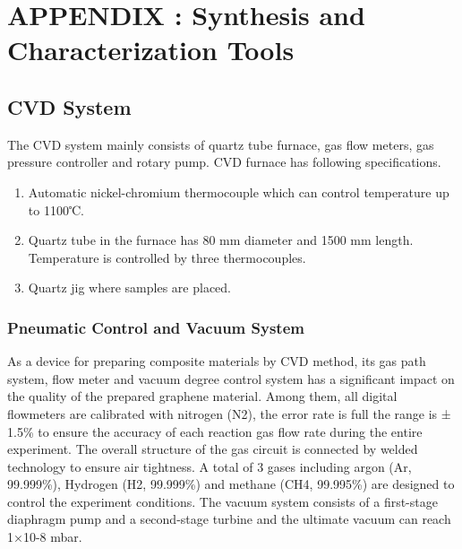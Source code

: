 

\section*{APPENDIX \thesection : Synthesis and Characterization Tools}



\subsection{CVD System}

The CVD system mainly consists of quartz tube furnace, gas flow meters, gas pressure controller and rotary pump.
CVD furnace has following specifications.
\begin{enumerate}
\item Automatic nickel-chromium thermocouple which can control temperature up to 1100℃.
\item Quartz tube in the furnace has 80 mm diameter and 1500 mm length. Temperature is controlled by three thermocouples.%
\item Quartz jig where samples are placed.
\end{enumerate}

\subsubsection{Pneumatic Control and Vacuum System}

As a device for preparing composite materials by CVD method, its gas path system, flow meter and vacuum degree control system has a significant impact on the quality of the prepared graphene material. Among them, all digital flowmeters are calibrated with nitrogen (N2), the error rate is full the range is ± 1.5\% to ensure the accuracy of each reaction gas flow rate during the entire experiment. The overall structure of the gas circuit is connected by welded technology to ensure air tightness. A total of 3 gases including argon (Ar, 99.999\%), Hydrogen (H2, 99.999\%) and methane (CH4, 99.995\%) are designed to control the experiment conditions. The vacuum system consists of a first-stage diaphragm pump and a second-stage turbine and the ultimate vacuum can reach 1×10-8 mbar.

